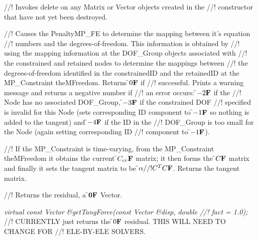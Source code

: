 //! Invokes delete on any Matrix or Vector objects created in the
//! constructor that have not yet been destroyed.

//! Causes the PenaltyMP\_FE to determine the mapping between it's equation
//! numbers and the degrees-of-freedom. This information is obtained by
//! using the mapping information at the DOF\_Group objects associated with
//! the constrained and retained nodes to determine the mappings between
//! the degrees-of-freedom identified in the \p constrainedID and the
\p retainedID at the MP\_Constraint \p theMFreedom. Returns \f$0{\bf F}$ if
//! successful. Prints a warning message and returns a negative number if
//! an error occurs: \f$-2{\bf F}$ if the
//! Node has no associated DOF\_Group, \f$-3{\bf F}$ if the constrained DOF
//! specified is invalid for this Node (sets corresponding ID component to
\f$-1{\bf F}$ so nothing is added to the tangent) and \f$-4{\bf F}$ if the ID in the
//! DOF\_Group is too small for the Node (again setting corresponding ID
//! component to \f$-1{\bf F}$). 


//! If the MP\_Constraint is time-varying, from the MP\_Constraint
\p theMFreedom it obtains the current \f$C_{cr}{\bf F}$ matrix; it then forms the
\f$C{\bf F}$ matrix and finally it sets the tangent matrix to be \f$\alpha
//! C^TC{\bf F}$. Returns the tangent matrix.

//! Returns the residual, a \f${\bf 0}{\bf F}$ Vector.

{\em virtual const Vector \&getTangForce(const Vector \&disp, double
//! fact = 1.0);    }
//! CURRENTLY just returns the \f$0{\bf F}$ residual. THIS WILL NEED TO CHANGE FOR
//! ELE-BY-ELE SOLVERS. 

